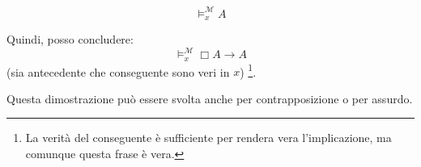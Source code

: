 \documentclass[a4paper,12pt]{article}
\begin{document}
\begin{dimo}
\begin{enumerate}
		\begin{minipage}{0.48\textwidth}
				$$\vDash_x^{\mathcal{M}} A$$
		\end{minipage}
		\begin{minipage}{0.48\textwidth}
			\begin{center}
			\end{center}
		\end{minipage}
		\vspace{4pt}
		
		Quindi, posso concludere:
		$$\vDash_x^{\mathcal{M}} \Box A \to A$$
		(sia antecedente che conseguente sono veri in $x$) \footnote{La verità del conseguente è sufficiente per rendera vera l'implicazione, ma comunque questa frase è vera.}.
	\end{enumerate}
\end{dimo}
Questa dimostrazione può essere svolta anche per contrapposizione o per assurdo. \\
\end{document}
